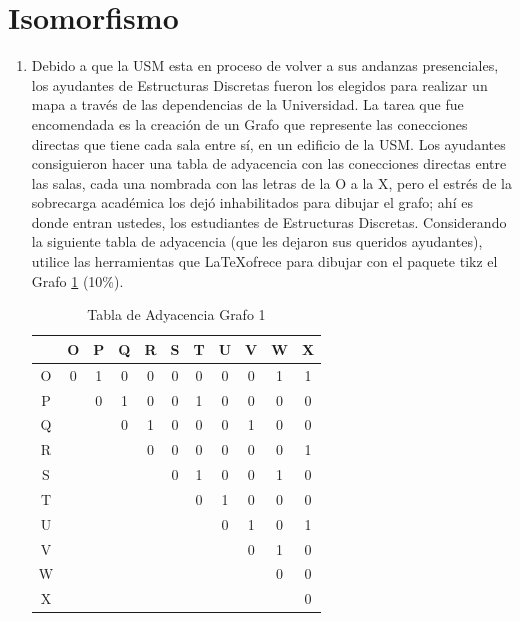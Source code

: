 \documentclass[letterpaper,10pt]{article}
\begin{document}
\section{Isomorfismo}
\begin{enumerate}
    \item Debido a que la USM esta en proceso de volver a sus andanzas presenciales, los ayudantes de Estructuras Discretas fueron los elegidos para realizar un mapa a través de las dependencias de la Universidad. La tarea que fue encomendada es la creación de un Grafo que represente las conecciones directas que tiene cada sala entre sí, en un edificio de la USM. Los ayudantes consiguieron hacer una tabla de adyacencia con las conecciones directas entre las salas, cada una nombrada con las letras de la O a la X, pero el estrés de la sobrecarga académica los dejó inhabilitados para dibujar el grafo; ahí es donde entran ustedes, los estudiantes de Estructuras Discretas. Considerando la siguiente tabla de adyacencia (que les dejaron sus queridos ayudantes), utilice las herramientas que \LaTeX \:ofrece para dibujar con el paquete tikz el Grafo \ref{tab:G1} (10\%).

        \begin{table}[H]
        \centering
        \begin{tabular}{c|cccccccccc}
               & O & P & Q & R & S & T & U & V & W & X \\
             \hline
             O & 0 & 1 & 0 & 0 & 0 & 0 & 0 & 0 & 1 & 1\\
             P &   & 0 & 1 & 0 & 0 & 1 & 0 & 0 & 0 & 0\\
             Q &   &   & 0 & 1 & 0 & 0 & 0 & 1 & 0 & 0\\
             R &   &   &   & 0 & 0 & 0 & 0 & 0 & 0 & 1\\
             S &   &   &   &   & 0 & 1 & 0 & 0 & 1 & 0\\
             T &   &   &   &   &   & 0 & 1 & 0 & 0 & 0\\
             U &   &   &   &   &   &   & 0 & 1 & 0 & 1\\
             V &   &   &   &   &   &   &   & 0 & 1 & 0\\
             W &   &   &   &   &   &   &   &   & 0 & 0\\
             X &   &   &   &   &   &   &   &   &   & 0\\
        \end{tabular} 
        \caption{Tabla de Adyacencia Grafo 1}
        \label{tab:G1}
    \end{table}
    

\end{enumerate}
\end{document}
